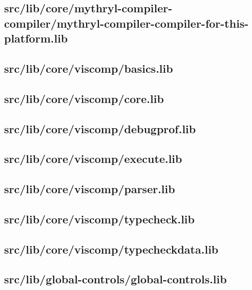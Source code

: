 \subsection{src/lib/core/mythryl-compiler-compiler/mythryl-compiler-compiler-for-this-platform.lib}


\subsection{src/lib/core/viscomp/basics.lib}


\subsection{src/lib/core/viscomp/core.lib}


\subsection{src/lib/core/viscomp/debugprof.lib}


\subsection{src/lib/core/viscomp/execute.lib}


\subsection{src/lib/core/viscomp/parser.lib}


\subsection{src/lib/core/viscomp/typecheck.lib}


\subsection{src/lib/core/viscomp/typecheckdata.lib}


\subsection{src/lib/global-controls/global-controls.lib}


